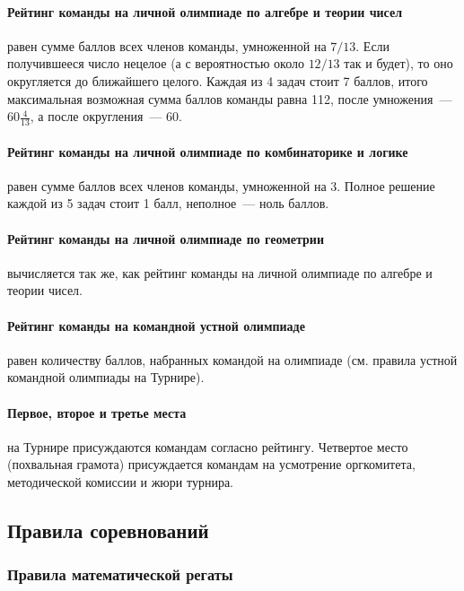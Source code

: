 \paragraph{Рейтинг команды на личной олимпиаде по алгебре и теории чисел}
равен сумме баллов всех членов команды, умноженной на $7/13$.
Если получившееся число нецелое (а с вероятностью около $12/13$ так и будет), то оно
округляется до ближайшего целого.
Каждая из 4 задач стоит 7 баллов, итого максимальная возможная сумма баллов
команды равна 112, после умножения~--- $60\frac{4}{13}$, а после
округления~--- 60.
\paragraph{Рейтинг команды на личной олимпиаде по комбинаторике и логике}
равен сумме баллов  всех членов команды, умноженной на 3.
Полное решение каждой из 5 задач стоит 1 балл, неполное~--- ноль баллов.
\paragraph{Рейтинг команды на личной олимпиаде по геометрии}
вычисляется так же, как рейтинг команды на личной олимпиаде по алгебре и теории чисел.
\paragraph{Рейтинг команды на командной устной олимпиаде}
равен количеству баллов, набранных командой на олимпиаде (см. правила устной
командной олимпиады на Турнире).
\paragraph{Первое, второе и третье места}
на Турнире присуждаются командам согласно рейтингу.
Четвертое место (похвальная грамота) присуждается командам на усмотрение
оргкомитета, методической комиссии и жюри турнира.

\subsection*{Правила соревнований}

\subsubsection*{Правила математической регаты}

